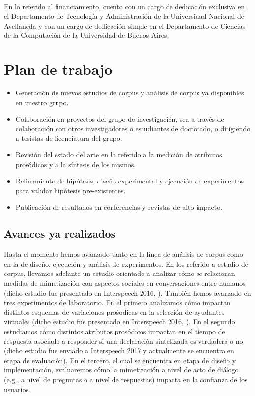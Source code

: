 \documentclass{article}
\begin{document}
\

En lo referido al financiamiento, cuento con un cargo de dedicación exclusiva 
en el Departamento de Tecnología y Administración de la Universidad Nacional 
de Avellaneda y con un cargo de dedicación simple en el Departamento de Ciencias 
de la Computación de la Universidad de Buenos Aires.

\section{Plan de trabajo}

\begin{itemize}

\item Generación de nuevos estudios de corpus y análisis de corpus ya disponibles en nuestro grupo.

\item Colaboración en proyectos del grupo de investigación, sea a través de colaboración con otros investigadores o estudiantes de doctorado, o dirigiendo a tesistas de licenciatura del grupo.

\item Revisión del estado del arte en lo referido a la medición de atributos prosódicos y a la síntesis de los mismos.

\item Refinamiento de hipótesis, diseño experimental y ejecución de experimentos para validar hipótesis pre-existentes.

\item Publicación de resultados en conferencias y revistas de alto impacto.

\end{itemize}

\subsection{Avances ya realizados}

Hasta el momento hemos avanzado tanto en la línea de análisis de corpus como en la de diseño, ejecución y análisis de experimentos. En los referido a estudio de corpus, llevamos adelante un estudio orientado a analizar cómo se relacionan medidas de mimetización con aspectos sociales en conversaciones entre humanos (dicho estudio fue presentado en Interspeech 2016, \cite{perez2016disentrainment}). También hemos avanzado en tres experimentos de laboratorio. En el primero analizamos cómo impactan distintos esquemas de variaciones prośodicas en la selección de ayudantes virtuales (dicho estudio fue presentado en Interspeech 2016, \cite{levitan2016implementing}). En el segundo estudiamos cómo distintos atributos prosódicos impactan en el tiempo de respuesta asociado a responder si una declaración sintetizada es verdadera o no (dicho estudio fue enviado a Interspeech 2017 y actualmente se encuentra en etapa de evaluación). En el tercero, el cual se encuentra en etapa de diseño y implementación, evaluaremos cómo la mimetización a nivel de acto de diálogo (e.g., a nivel de preguntas o a nivel de respuestas) impacta en la confianza de los usuarios.
\end{document}
